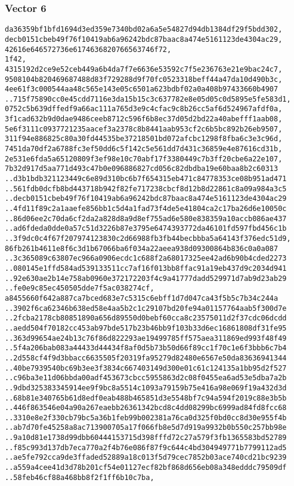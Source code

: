 \documentclass[
]{article}
\begin{document}
\hypertarget{vector-6-2}{%
\subsubsection{Vector 6}\label{vector-6-2}}

\begin{verbatim}
da36359bf1bfd1694d3ed359e7340bd02a6a5e54827d94db1384df29f5bdd302,
decb0151cbeb49f76f10419ab6a96242bdc87baac8a474e5161123de4304ac29,
42616e646572736e6174636820766563746f72,
1f42,
4315192d2ce9e52ceb449a6b4da7f7e6636e53592c7f5e236763e21e9bac24c7,
9508104b820469687488d83f729288d9f70fc0523318beff44a47da10d490b3c,
4ee61f3c000544aa48c565e143e05c6501a623bdbf02a0a408b97433660b4907
..715f75890cc0e45cdd7116e3da15b15c3c637782e8e05d05c0d5895e5fe583d1,
0752c5b639dffedf9a66ac111a765d3e9c4cfac9c8b26cc5af6d524967afdf0a,
3f1cad632b9d0dae9486ceeb8712c596f6b8ec37d05d2bd22a40abefff1aab08,
5e6f3111c0937721235aacef3a2378c8b8441aab953cf2c6b5bc892b26eb9507,
311f94e886825c80a30fd44535be37218501bd072afcbc1298f8fba6c3e3c96d,
7451da70df2a6788fc3ef50dd6c5f142c5e561dd7d431c36859e4e87616cd31b,
2e531e6fda5a65120809f3ef98e10c70abf17f3380449c7b3ff20cbe6a22e107,
7b32d917d5aa771d493c47b0e096886827cd056c82dbdba19e60baa8b2c60313
..d3b1bdb321123449c6e89d310bc6b7f654315eb471c84778353ce08b951ad471
..561fdb0dcfb8bd443718b942f82fe717238cbcf8d12b8d22861c8a09a984a3c5
..decb0151cbeb49f76f10419ab6a96242bdc87baac8a474e5161123de4304ac29
..4fd11f89c2a1aaefe856bb1c5d4a1fad73f4de5e41804ca2c17ba26d6e10050c
..86d06ee2c70da6cf2da2a828d8a9d8ef755ad6e580e838359a10accb086ae437
..ad6fdeda0dde0a57c51d3226b87e3795e6474393772da46101fd597fbd456c1b
..3f9dc0c4f67f207974123830c2d66988fb3fb44becbbba5a64143f376edc51d9,
86fb261b4611e8f6c3d1b67066ba6f034a22aeea938d09300864b836c0a0a087
..3c365089c63807ec966a0906ecdc1c688f2a68017325ee42ad6b90b4cded2273
..080145e1ffd584ad539133511cc7af16f013bb8ffac91a19eb437d9c2034d941
..92e630ae2b14e758ab0960e372172203f4c9a41777dadd529971d7ab9d23ab29
..fe0e9c85ec450505dde7f5ac038274cf,
a8455660f642a887ca7bced683e7c5315c6ebff1d7d047ca43f5b5c7b34c244a
..3902f6ca62346b638ed58e4aa5b2c1c29107bd20fe94a01157764aab5f300d7e
..2fcba2178cb80851890a656d89550d0bebf60cca8c23575011d2f37cdc06dcdd
..aedd504f70182cc453ab97bde517b23b46bb9f103b33d6ec16861808df31fe95
..363d99654ae24b13c76f86d822293ae19499785ff575aea311869ed993f48f49
..5f4a206bab083a44433d44434f8af0d5b73b50d66f89cc1f70c1e6f3bbb6c7b4
..2d558cf4f9d3bbacc6635505f20319fa95279d82480e6567e50da83636941344
..40be7939540bc69b3ee3f3834c667403149d300e01c61c124135a1bb95d2f527
..c96ba3e11d06bbda00adf453673cbcc5955863d2c08f0455ea6ad53e5dba7a2b
..9dbd325383345914ee9f9bc8a5514c1093a79159b75e416a98e069f19a432d3d
..68b81e340765b61d8edf0eab488b465851d3e5548bf7c94a594f2019c88e3b5b
..446f863546e04a90a267eaebb26361342bcd8c4dd08299bc6999ad84fd8fcc68
..3310e8e2f330cb79bc5a36b1feb99b002381a76ca0d325f0bd0cc8d30e955f4b
..ab7d70fe45258a8ac713900705a17f066fb8e5d7d919a9932b0b550c257bb98e
..9a10d81e1738d99dbb60444153715d398fffd72c27a579f3fb1365583bd52789
..f85c993d137db7eca770a2f4b76e086f87f9c644c4bd304949771b7799112ad5
..ae5fe792cca9de3ffaded52889a18c013f5d79cec7852b03ace740cd21bc9239
..a559a4cee41d3d78b201cf54e01127ecf82bf868d656eb08a348edddc79509df
..58feb46cf88a468bb8f2f1ff6b10c7ba,
\end{verbatim}
\end{document}
